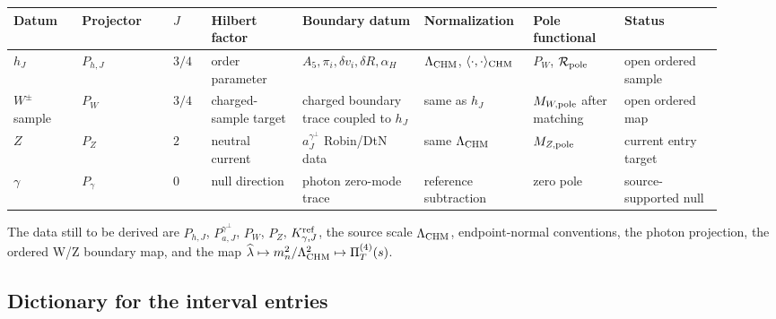\begin{widetext}
\begin{center}
\scriptsize
\begin{tabular}{p{0.09\linewidth}p{0.12\linewidth}p{0.055\linewidth}p{0.12\linewidth}p{0.16\linewidth}p{0.13\linewidth}p{0.12\linewidth}p{0.13\linewidth}}
\toprule
Datum & Projector & \(J\) & Hilbert factor & Boundary datum & Normalization & Pole functional & Status \\
\midrule
\(h_J\) & \(P_{h,J}\) & \(3/4\) & order parameter & \(A_5,\pi_i,\delta v_i,\delta R,\alpha_H\) & \(\Lambda_{\rm CHM}\), \(\langle\cdot,\cdot\rangle_{\rm CHM}\) & \(P_W\), \(\mathcal R_{\rm pole}\) & open ordered sample \\
\(W^\pm\) sample & \(P_W\) & \(3/4\) & charged-sample target & charged boundary trace coupled to \(h_J\) & same as \(h_J\) & \(M_{W,\rm pole}\) after matching & open ordered map \\
\(Z\) & \(P_Z\) & \(2\) & neutral current & \(a_J^{\gamma^\perp}\) Robin/DtN data & same \(\Lambda_{\rm CHM}\) & \(M_{Z,\rm pole}\) & current entry target \\
\(\gamma\) & \(P_\gamma\) & \(0\) & null direction & photon zero-mode trace & reference subtraction & zero pole & source-supported null \\
\bottomrule
\end{tabular}
\end{center}
\normalsize

The data still to be derived are \(P_{h,J}\), \(P_{a,J}^{\gamma^\perp}\),
\(P_W\), \(P_Z\), \(K_{\gamma,J}^{\rm ref}\), the source scale
\(\Lambda_{\rm CHM}\), endpoint-normal conventions, the photon projection, the
ordered W/Z boundary map, and the map
\(\widehat\lambda\mapsto m_n^2/\Lambda_{\rm CHM}^2\mapsto\Pi_T^{(4)}(s)\).
\end{widetext}

\subsection{Dictionary for the interval entries}
\label{sec:interval-entry-dictionary}

